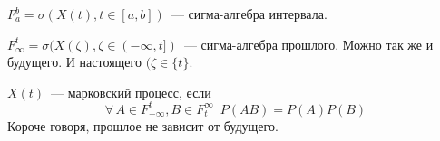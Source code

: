 \documentclass[12pt, timbord]{../../../notes}
\begin{document}
\begin{exmp}\label{exmp:proc::mark::sigint}
  $F_a^b = \sigma(X(t), t\in[a,b])$~--- сигма-алгебра интервала.
\end{exmp}
\begin{exmp}\label{exmp:proc::mark::sigpast}
  $F_\infty^t = \sigma(X(\zeta), \zeta\in(-\infty, t])$~--- сигма-алгебра прошлого. Можно так же и
  будущего. И настоящего $(\zeta\in\{t\}$.
\end{exmp}
\begin{defn}\label{exmp:proc::mark::mark}
  $X(t)$~--- марковский процесс, если 
  \[
    \forall\, A\in F_{-\infty}^{t}, B \in F_{t}^\infty \;\: P(AB) = P(A) P(B)
  \]
  Короче говоря, прошлое не зависит от будущего.
\end{defn}
\end{document}
